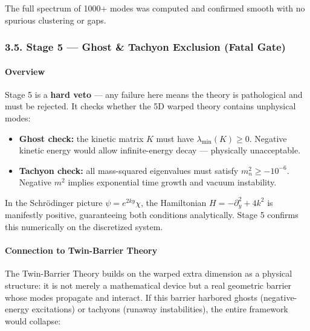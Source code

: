 \documentclass[
  11pt,
]{article}
\providecommand{\tightlist}{%
  \setlength{\itemsep}{0pt}\setlength{\parskip}{0pt}}
\begin{document}
The full spectrum of 1000+ modes was computed and confirmed smooth with
no spurious clustering or gaps.

\bigskip

\hypertarget{stage-5-ghost-tachyon-exclusion-fatal-gate}{%
\subsubsection{3.5. Stage 5 --- Ghost \& Tachyon Exclusion (Fatal
Gate)}\label{stage-5-ghost-tachyon-exclusion-fatal-gate}}

\hypertarget{overview-4}{%
\paragraph{Overview}\label{overview-4}}

Stage 5 is a \textbf{hard veto} --- any failure here means the theory is
pathological and must be rejected. It checks whether the 5D warped
theory contains unphysical modes:

\begin{itemize}
\tightlist
\item
  \textbf{Ghost check:} the kinetic matrix \(K\) must have
  \(\lambda_\text{min}(K) \geq 0\). Negative kinetic energy would allow
  infinite-energy decay --- physically unacceptable.
\item
  \textbf{Tachyon check:} all mass-squared eigenvalues must satisfy
  \(m_n^2 \geq -10^{-6}\). Negative \(m^2\) implies exponential time
  growth and vacuum instability.
\end{itemize}

In the Schrödinger picture \(\psi = e^{2ky}\chi\), the Hamiltonian
\(H = -\partial_y^2 + 4k^2\) is manifestly positive, guaranteeing both
conditions analytically. Stage 5 confirms this numerically on the
discretized system.

\bigskip

\hypertarget{connection-to-twin-barrier-theory-4}{%
\paragraph{Connection to Twin-Barrier
Theory}\label{connection-to-twin-barrier-theory-4}}

The Twin-Barrier Theory builds on the warped extra dimension as a
physical structure: it is not merely a mathematical device but a real
geometric barrier whose modes propagate and interact. If this barrier
harbored ghosts (negative-energy excitations) or tachyons (runaway
instabilities), the entire framework would collapse:
\end{document}
